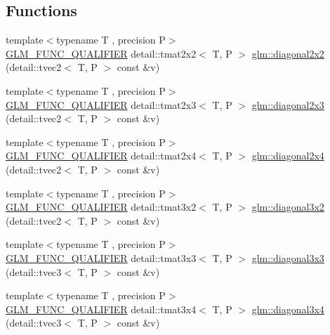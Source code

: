 \subsection*{Functions}
\begin{DoxyCompactItemize}
\item 
{\footnotesize template$<$typename T , precision P$>$ }\\\hyperlink{setup_8hpp_a33fdea6f91c5f834105f7415e2a64407}{G\+L\+M\+\_\+\+F\+U\+N\+C\+\_\+\+Q\+U\+A\+L\+I\+F\+I\+ER} detail\+::tmat2x2$<$ T, P $>$ \hyperlink{group__gtx__matrix__operation_gae4177a43a89e6b4b7352f82198f2ea84}{glm\+::diagonal2x2} (detail\+::tvec2$<$ T, P $>$ const \&v)
\item 
{\footnotesize template$<$typename T , precision P$>$ }\\\hyperlink{setup_8hpp_a33fdea6f91c5f834105f7415e2a64407}{G\+L\+M\+\_\+\+F\+U\+N\+C\+\_\+\+Q\+U\+A\+L\+I\+F\+I\+ER} detail\+::tmat2x3$<$ T, P $>$ \hyperlink{group__gtx__matrix__operation_ga873468c41cb29fb84a12a866549e0136}{glm\+::diagonal2x3} (detail\+::tvec2$<$ T, P $>$ const \&v)
\item 
{\footnotesize template$<$typename T , precision P$>$ }\\\hyperlink{setup_8hpp_a33fdea6f91c5f834105f7415e2a64407}{G\+L\+M\+\_\+\+F\+U\+N\+C\+\_\+\+Q\+U\+A\+L\+I\+F\+I\+ER} detail\+::tmat2x4$<$ T, P $>$ \hyperlink{group__gtx__matrix__operation_gaf97e094855cc3c6186b879d045f67aca}{glm\+::diagonal2x4} (detail\+::tvec2$<$ T, P $>$ const \&v)
\item 
{\footnotesize template$<$typename T , precision P$>$ }\\\hyperlink{setup_8hpp_a33fdea6f91c5f834105f7415e2a64407}{G\+L\+M\+\_\+\+F\+U\+N\+C\+\_\+\+Q\+U\+A\+L\+I\+F\+I\+ER} detail\+::tmat3x2$<$ T, P $>$ \hyperlink{group__gtx__matrix__operation_gabf8e8445e2884aeaa35f0ec32ba5bd01}{glm\+::diagonal3x2} (detail\+::tvec2$<$ T, P $>$ const \&v)
\item 
{\footnotesize template$<$typename T , precision P$>$ }\\\hyperlink{setup_8hpp_a33fdea6f91c5f834105f7415e2a64407}{G\+L\+M\+\_\+\+F\+U\+N\+C\+\_\+\+Q\+U\+A\+L\+I\+F\+I\+ER} detail\+::tmat3x3$<$ T, P $>$ \hyperlink{group__gtx__matrix__operation_gaa49be0f424ad2f3015c5945c13a5fad0}{glm\+::diagonal3x3} (detail\+::tvec3$<$ T, P $>$ const \&v)
\item 
{\footnotesize template$<$typename T , precision P$>$ }\\\hyperlink{setup_8hpp_a33fdea6f91c5f834105f7415e2a64407}{G\+L\+M\+\_\+\+F\+U\+N\+C\+\_\+\+Q\+U\+A\+L\+I\+F\+I\+ER} detail\+::tmat3x4$<$ T, P $>$ \hyperlink{group__gtx__matrix__operation_gab96c533557a191bd972300868f8111ef}{glm\+::diagonal3x4} (detail\+::tvec3$<$ T, P $>$ const \&v)

\end{DoxyCompactItemize}
